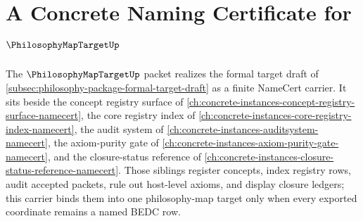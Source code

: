 \chapter{A Concrete Naming Certificate for $\PhilosophyMapTargetUp$}
\label{ch:concrete-instances-philosophy-map-target-namecert}

The $\PhilosophyMapTargetUp$ packet realizes the formal target draft of \autoref{subsec:philosophy-package-formal-target-draft} as a finite NameCert carrier. It sits beside the concept registry surface of \autoref{ch:concrete-instances-concept-registry-surface-namecert}, the core registry index of \autoref{ch:concrete-instances-core-registry-index-namecert}, the audit system of \autoref{ch:concrete-instances-auditsystem-namecert}, the axiom-purity gate of \autoref{ch:concrete-instances-axiom-purity-gate-namecert}, and the closure-status reference of \autoref{ch:concrete-instances-closure-status-reference-namecert}. Those siblings register concepts, index registry rows, audit accepted packets, rule out host-level axioms, and display closure ledgers; this carrier binds them into one philosophy-map target only when every exported coordinate remains a named BEDC row.

